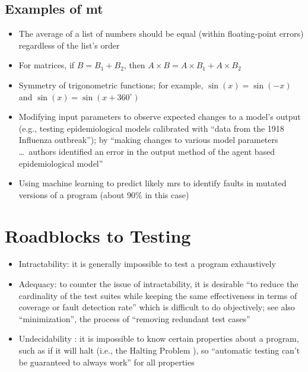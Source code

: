 \subsection[Examples of MT]{Examples of \acs{mt}}
\begin{itemize}
      \item The average of a list of numbers should be equal (within
            floating-point errors) regardless of the list's order
            \citep[p.~67]{KanewalaAndYuehChen2019}
      \item For matrices, if $B = B_1 + B_2$, then $A \times B = A \times B_1
                  + A \times B_2$ \citep[pp.~68-69]{KanewalaAndYuehChen2019}
      \item Symmetry of trigonometric functions; for example, $\sin(x) = \sin(-x)$
            and $\sin(x) = \sin(x + 360^{\circ})$ \citep[p.~70]{KanewalaAndYuehChen2019}
      \item Modifying input parameters to observe expected changes to a model's
            output (e.g., testing epidemiological models calibrated with
            ``data from the 1918 Influenza outbreak''); by ``making changes to
            various model parameters \dots\ authors identified an error in the
            output method of the agent based epidemiological model''
            \citep[p.~70]{KanewalaAndYuehChen2019}
      \item Using machine learning to predict likely \acsp{mr} to identify
            faults in mutated versions of a program (about 90\% in this case)
            \citep[p.~71]{KanewalaAndYuehChen2019}
\end{itemize}

\section{Roadblocks to Testing}

\begin{itemize}
      \item Intractability: it is generally impossible to test a program
            exhaustively \exhInfCite{}
      \item Adequacy: to counter the issue of intractability, it is desirable
            ``to reduce the cardinality of the test suites while keeping the
            same effectiveness in terms of coverage or fault detection rate''
            \citep[p.~5-4]{SWEBOK2024} which is difficult to do objectively;
            see also ``minimization'', the process of ``removing redundant test
            cases'' \citep[p.~5-4]{SWEBOK2024}
      \item Undecidability \citep[p.~439]{PetersAndPedrycz2000}: it is
            impossible to know certain properties about a program, such as if
            it will halt (i.e., the Halting Problem
            \citep[p.~4]{gurfinkel_testing_2017}), so ``automatic testing
            can't be guaranteed to always work'' for all properties
            \citep{nelson_formal_1999} 
\end{itemize}

